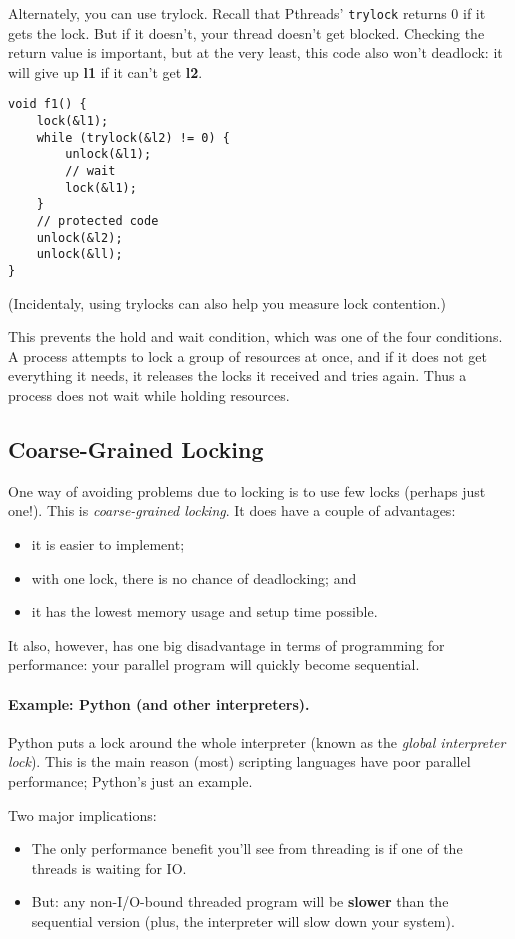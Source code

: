 Alternately, you can use trylock. Recall that Pthreads' {\tt trylock}
returns 0 if it gets the lock. But if it doesn't, your thread doesn't get blocked. Checking the return value is important, but at the very least, this code also won't deadlock: it will give up {\bf l1} if it can't get {\bf l2}.
  \begin{verbatim}
void f1() {
    lock(&l1);
    while (trylock(&l2) != 0) {
        unlock(&l1);
        // wait
        lock(&l1);
    }
    // protected code
    unlock(&l2);
    unlock(&ll);    
}
  \end{verbatim}
  (Incidentaly, using trylocks can also help you measure lock contention.)
  
This prevents the hold and wait condition, which was one of the four conditions. A process attempts to lock a group of resources at once, and if it does not get everything it needs, it releases the locks it received and tries again. Thus a process does not wait while holding resources.

\subsection*{Coarse-Grained Locking}
One way of avoiding problems due to locking is to use few locks
(perhaps just one!). This is \emph{coarse-grained locking}.
It does have a couple of advantages:
  \begin{itemize}
    \item it is easier to implement;
    \item with one lock, there is no chance of deadlocking; and
    \item it has the lowest memory usage and setup time possible.
  \end{itemize}

It also, however, has one big disadvantage in terms of programming for performance: your parallel program will quickly become sequential.

\paragraph{Example: Python (and other interpreters).}
Python puts a lock around the whole interpreter (known as the
\emph{global interpreter lock}).  This is the main reason (most)
scripting languages have poor parallel performance; Python's just an
example.

Two major implications:
\begin{itemize}
\item The only performance benefit you'll see from threading is if one of the threads is
      waiting for IO.
\item But: any non-I/O-bound threaded program will be {\bf slower} than the sequential
      version (plus, the interpreter will slow down your system).
\end{itemize}

